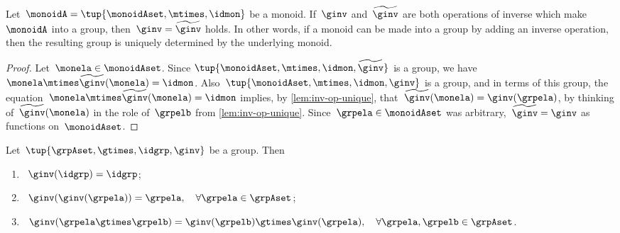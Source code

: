 \begin{corollary}
	\label{cor:inv-op-unique}
	Let~$\monoidA = \tup{\monoidAset, \mtimes,  \idmon }$ be a monoid.
	If~$\ginv$ and~$\widetilde \ginv$ are both operations of inverse which make~$\monoidA$ into a group, then~$\ginv = \widetilde \ginv$ holds.
	In other words, if a monoid can be made into a group by adding an inverse operation, then the resulting group is uniquely determined by the underlying monoid.
\end{corollary}

\begin{proof}
	Let~$\monela \in \monoidAset$.
	Since $\tup{\monoidAset, \mtimes,  \idmon, \widetilde \ginv }$ is a group, we have~$\monela \mtimes  \widetilde \ginv(\monela) = \idmon$.
	Also~$\tup{\monoidAset, \mtimes,  \idmon, \ginv }$ is a group, and in terms of this group, the equation~$\monela \mtimes  \widetilde \ginv(\monela) = \idmon$ implies, by \cref{lem:inv-op-unique}, that~$\widetilde \ginv(\monela) = \ginv(\grpela)$, by thinking of~$\widetilde \ginv(\monela)$ in the role of~$\grpelb$ from \cref{lem:inv-op-unique}.
	Since~$\grpela \in \monoidAset$ was arbitrary,~$\widetilde \ginv = \ginv$ as functions on~$\monoidAset$.
\end{proof}

\begin{lemma}
	\label{lem:inv-op-properties}
	Let~$\tup{\grpAset, \gtimes, \idgrp, \ginv}$ be a group.
	Then
	\begin{enumerate}
		\item\label{eq:group-neutral-invariant}~$\ginv(\idgrp) = \idgrp$;
		\item\label{eq:group-inverse-inverse}~$ \ginv(\ginv(\grpela)) = \grpela, \quad \forall \grpela \in \grpAset$;
		\item\label{eq:group-inverse-of-composition}~$\ginv(\grpela \gtimes \grpelb ) = \ginv(\grpelb) \gtimes \ginv(\grpela), \quad \forall \grpela, \grpelb \in \grpAset$.
	\end{enumerate}
\end{lemma}


